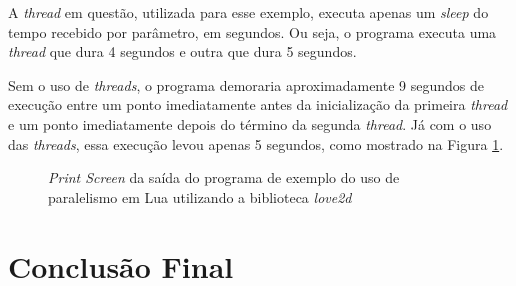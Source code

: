 \documentclass[rel_mlp]{iiufrgs}
\begin{document}
A \textit{thread} em questão, utilizada para esse exemplo, executa apenas um \textit{sleep} do tempo recebido por parâmetro, em segundos. Ou seja, o programa executa uma \textit{thread} que dura 4 segundos e outra que dura 5 segundos.

Sem o uso de \textit{threads}, o programa demoraria aproximadamente 9 segundos de execução entre um ponto imediatamente antes da inicialização da primeira \textit{thread} e um ponto imediatamente depois do término da segunda \textit{thread}. Já com o uso das \textit{threads}, essa execução levou apenas 5 segundos, como mostrado na Figura \ref{fig:Figura2}.

\begin{figure}[H]
     \centering
     \caption{\textit{Print Screen} da saída do programa de exemplo do uso de paralelismo em Lua utilizando a biblioteca \textit{love2d}}
     \label{fig:Figura2}
\end{figure}

\chapter{Conclusão Final}






%

%



%

\end{document}
